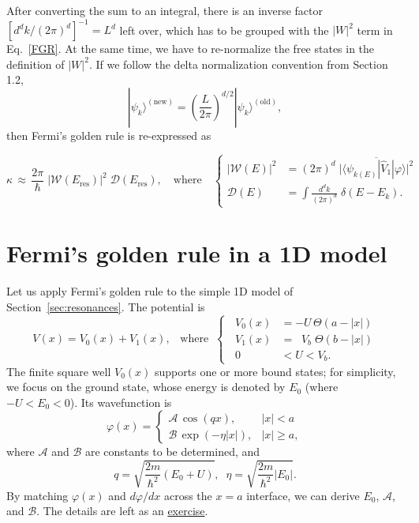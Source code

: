\documentclass[pra,12pt]{revtex4}
\begin{document}
After converting the sum to an integral, there is an inverse factor
$\left[d^dk/(2\pi)^d\right]^{-1} = L^{d}$ left over, which has to be
grouped with the $|W|^2$ term in Eq.~\eqref{FGR}.  At the same time,
we have to re-normalize the free states in the definition of $|W|^2$.
If we follow the delta normalization convention from Section 1.2,
\begin{equation}
  |\psi_k\rangle^{(\textrm{new})}
  = \left(\frac{L}{2\pi}\right)^{d/2} |\psi_{k}\rangle^{(\textrm{old})},
\end{equation}
then Fermi's golden rule is re-expressed as
\begin{framed}
  \begin{equation}
    \kappa
    \,\approx\, \frac{2\pi}{\hbar} \;
    \big|\mathcal{W}(E_\mathrm{res})\big|^2 \; \mathcal{D}(E_{\mathrm{res}}),
    \quad \mathrm{where} \quad \left\{
    \begin{aligned}
      \big|\mathcal{W}(E)\big|^2
      &= (2\pi)^d \;
      \overline{\Big| \langle\psi_{k(E)}| \hat{V}_1|\varphi\rangle\Big|^2} \\
      \mathcal{D}(E) &= \int \frac{d^dk}{(2\pi)^d} \; \delta(E-E_k).
    \end{aligned}\right.
    \label{FGR2}
  \end{equation}
\end{framed}

\section{Fermi's golden rule in a 1D model}
\label{sec:fgr1d}

Let us apply Fermi's golden rule to the simple 1D model of
Section~\ref{sec:resonances}.  The potential is
\begin{equation}
  V(x) = V_0(x) + V_1(x), \;\;\;\mathrm{where}\;\;
  \left\{\;\;
  \begin{aligned}
    V_0(x) &= -U \, \Theta(a-|x|) \\
    V_1(x) &= \;\;V_b\; \Theta(b-|x|) \\
    0 &<U<V_b.
  \end{aligned}\right.
\end{equation}
The finite square well $V_0(x)$ supports one or more bound states; for
simplicity, we focus on the ground state, whose energy is denoted by
$E_0$ (where $-U < E_0 < 0$).  Its wavefunction is
\begin{equation}
  \varphi(x) = \begin{cases}\mathcal{A}\,\cos(qx), & |x| < a \\
    \mathcal{B} \, \exp\left(-\eta|x|\right), & |x| \ge a,\end{cases}
  \label{varphiansatz0}
\end{equation}
where $\mathcal{A}$ and $\mathcal{B}$ are constants to be determined,
and
\begin{equation}
  q = \sqrt{\frac{2m}{\hbar^2}(E_0+U)}, \;\; \eta = \sqrt{\frac{2m}{\hbar^2}|E_0|}.
\end{equation}
By matching $\varphi(x)$ and $d\varphi/dx$ across the $x=a$ interface,
we can derive $E_0$, $\mathcal{A}$, and $\mathcal{B}$.  The details
are left as an \hyperref[ex:1dfgr]{exercise}.
\end{document}
